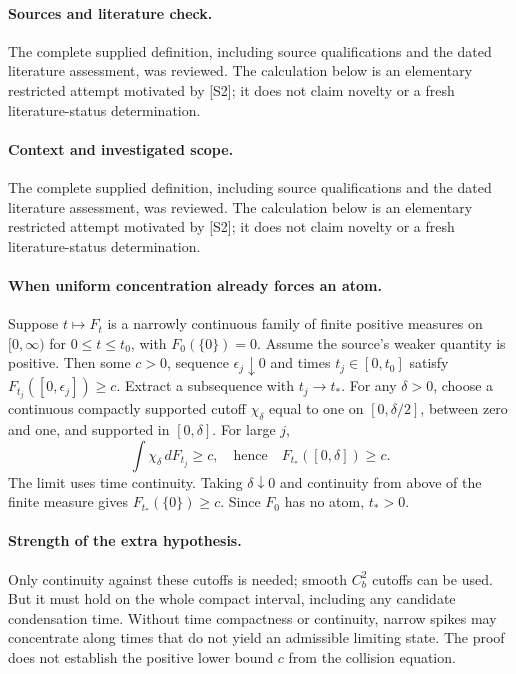 \documentclass[11pt]{article}
\begin{document}
\paragraph{Sources and literature check.}
The complete supplied definition, including source qualifications and the dated literature assessment, was reviewed. The calculation below is an elementary restricted attempt motivated by [S2]; it does not claim novelty or a fresh literature-status determination.

\paragraph{Context and investigated scope.} The complete supplied definition, including source qualifications and the dated literature assessment, was reviewed. The calculation below is an elementary restricted attempt motivated by [S2]; it does not claim novelty or a fresh literature-status determination.

\paragraph{When uniform concentration already forces an atom.} Suppose $t\mapsto F_t$ is a narrowly continuous family of finite positive measures on $[0,\infty)$ for $0\leq t\leq t_0$, with $F_0(\{0\})=0$. Assume the source's weaker quantity is positive. Then some $c>0$, sequence $\epsilon_j\downarrow0$ and times $t_j\in[0,t_0]$ satisfy $F_{t_j}([0,\epsilon_j])\geq c$. Extract a subsequence with $t_j\to t_*$. For any $\delta>0$, choose a continuous compactly supported cutoff $\chi_\delta$ equal to one on $[0,\delta/2]$, between zero and one, and supported in $[0,\delta]$. For large $j$,
\[
 \int\chi_\delta\,dF_{t_j}\geq c,
 \quad\text{hence}\quad F_{t_*}([0,\delta])\geq c.
\]
The limit uses time continuity. Taking $\delta\downarrow0$ and continuity from above of the finite measure gives $F_{t_*}(\{0\})\geq c$. Since $F_0$ has no atom, $t_*>0$.

\paragraph{Strength of the extra hypothesis.} Only continuity against these cutoffs is needed; smooth $C_b^2$ cutoffs can be used. But it must hold on the whole compact interval, including any candidate condensation time. Without time compactness or continuity, narrow spikes may concentrate along times that do not yield an admissible limiting state. The proof does not establish the positive lower bound $c$ from the collision equation.
\end{document}
